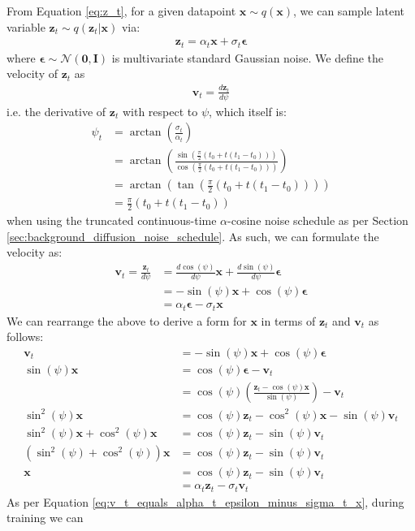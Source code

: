 \documentclass[ oneside,%
                    author={George Herbert},
                    degree={MSci},
                     title={Diffusion Models for Time-Evolving Precipitation Fields},
                  subtitle={}]{dissertation}
\begin{document}
From Equation \ref{eq:z_t}, for a given datapoint $\mathbf{x}\sim q(\mathbf{x})$, we can sample latent variable $\mathbf{z}_t\sim q(\mathbf{z}_t|\mathbf{x})$ via:
\begin{align}
      \mathbf{z}_t=\alpha_t\mathbf{x}+\sigma_t\boldsymbol\epsilon
\end{align}
where $\boldsymbol\epsilon\sim\mathcal{N}(\mathbf{0},\mathbf{I})$ is multivariate standard Gaussian noise. We define the velocity of $\mathbf{z}_t$ as
\begin{align}
      \mathbf{v}_t=\frac{d\mathbf{z}_t}{d \psi}
\end{align}
i.e. the derivative of $\mathbf{z}_t$ with respect to $\psi$, which itself is:
\begin{align}
      \psi_t&=\arctan\left(\frac{\sigma_t}{\alpha_t}\right)\\
      &=\arctan\left(\frac{\sin\left(\frac{\pi}{2}(t_0+t(t_1-t_0))\right)}{\cos\left(\frac{\pi}{2}(t_0+t(t_1-t_0))\right)}
      \right)\\
      &=\arctan\left(\tan\left(\frac{\pi}{2}(t_0+t(t_1-t_0))\right)\right)\\
      &=\frac{\pi}{2}(t_0+t(t_1-t_0))
\end{align}
when using the truncated continuous-time $\alpha$-cosine noise schedule as per Section \ref{sec:background_diffusion_noise_schedule}. As such, we can formulate the velocity as:
\begin{align}
      \mathbf{v}_t=\frac{\mathbf{z}_t}{d\psi}&=\frac{d\cos(\psi)}{d\psi}\mathbf{x}+\frac{d\sin(\psi)}{d\psi}\boldsymbol\epsilon\\
      &=-\sin(\psi)\mathbf{x}+\cos(\psi)\boldsymbol\epsilon\\
      &=\alpha_t\boldsymbol\epsilon-\sigma_t\mathbf{x}\label{eq:v_t_equals_alpha_t_epsilon_minus_sigma_t_x}
\end{align}
We can rearrange the above to derive a form for $\mathbf{x}$ in terms of $\mathbf{z}_t$ and $\mathbf{v}_t$ as follows:
\begin{align}
      \mathbf{v}_t&=-\sin(\psi)\mathbf{x}+\cos(\psi)\boldsymbol\epsilon\\
      \sin(\psi)\mathbf{x}&=\cos(\psi)\boldsymbol\epsilon-\mathbf{v}_t\\
      &=\cos(\psi)\left(\frac{\mathbf{z}_t-\cos(\psi)\mathbf{x}}{\sin(\psi)}\right)-\mathbf{v}_t\\
      \sin^2(\psi)\mathbf{x}&=\cos(\psi)\mathbf{z}_t-\cos^2(\psi)\mathbf{x}-\sin(\psi)\mathbf{v}_t\\
      \sin^2(\psi)\mathbf{x}+\cos^2(\psi)\mathbf{x}&=\cos(\psi)\mathbf{z}_t-\sin(\psi)\mathbf{v}_t\\
      (\sin^2(\psi)+\cos^2(\psi))\mathbf{x}&=\cos(\psi)\mathbf{z}_t-\sin(\psi)\mathbf{v}_t\\
      \mathbf{x}&=\cos(\psi)\mathbf{z}_t-\sin(\psi)\mathbf{v}_t\\
      &=\alpha_t\mathbf{z}_t-\sigma_t\mathbf{v}_t
\end{align}
As per Equation \ref{eq:v_t_equals_alpha_t_epsilon_minus_sigma_t_x}, during training we can 
\end{document}
